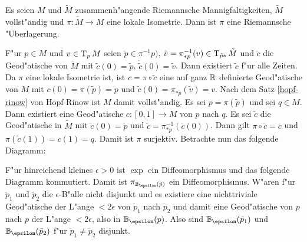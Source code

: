 \begin{Prop}\label{prop-9-12}
  Es seien $M$ und $\tilde M$ zusammenh"angende Riemannsche Mannigfaltigkeiten, $\tilde M$ vollst"andig und $\pi: \tilde M \to M$ eine lokale Isometrie. Dann ist $\pi$ eine Riemannsche "Uberlagerung.
\end{Prop}

\begin{bew}
  F"ur $p \in M$ und $v \in \operatorname{T}_pM$ seien $\tilde p \in \pi^{-1}p)$, $\tilde v = \pi_{*p}^{-1}(v) \in \operatorname{T}_{\tilde p *}\tilde M$ und $\tilde c$ die Geod"atische von $\tilde M$ mit $\tilde c(0) = \tilde p$, $\dot{\tilde{c}}(0) = \tilde v$.
  Dann existiert $\tilde c$ f"ur alle Zeiten. Da $\pi$ eine lokale Isometrie ist, ist $c = \pi \circ \tilde c$ eine auf ganz $\operatorname{\mathbb{R}}$ definierte Geod"atische von $M$ mit $c(0) = \pi(\tilde p) = p$ und $\tilde c(0) = \pi_{* \tilde p}(\tilde v) = v$.
  Nach dem Satz \ref{hopf-rinow} von Hopf-Rinow ist $M$ damit vollst"andig. Es sei $p = \pi(\tilde p)$ und sei $q \in M$.
  Dann existiert eine Geod"atische $c: [0,1] \to M$ von $p$ nach $q$. Es sei $\tilde c$ die Geod"atische in $\tilde M$ mit $\tilde c(0) = \tilde p$ und $\dot{\tilde{c}} = \pi_{*p}^{-1}(\dot c(0))$.
  Dann gilt $\pi \circ \tilde c = c$ und $\pi(\tilde c(1)) = c(1) = q$.
  Damit ist $\pi$ surjektiv. Betrachte nun das folgende Diagramm:
  \begin{center}\end{center}
  F"ur hinreichend kleines $\epsilon > 0$ ist $\exp$ ein Diffeomorphismus und das folgende Diagramm kommutiert.
  Damit ist $\pi_{\B_\epsilon(\tilde p)}$ ein Diffeomorphismus.
  W"aren f"ur $\tilde p_1$ und $\tilde p_2$ die $\epsilon$-B"alle nicht disjunkt und es existiere eine nichttriviale Geod"atische der L"ange $< 2 \epsilon$ von $\tilde p_1$ nach $\tilde p_2$ und damit eine Geod"atische von $p$ nach $p$ der L"ange $< 2 \epsilon$, also in $\B_\epsilon(p)$.
  Also sind $\B_\epsilon(\tilde p_1)$ und $\B_\epsilon(\tilde p_2)$ f"ur $\tilde p_1 \ne \tilde p_2$ disjunkt.
\end{bew}

